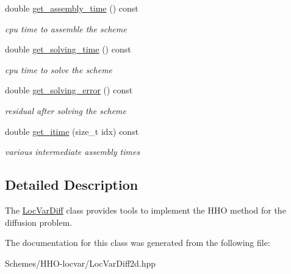 \begin{DoxyCompactItemize}
double \hyperlink{group__HHO__locvar_gae772fea2b994fc7b91bf5464cdc3ba1e}{get\+\_\+assembly\+\_\+time} () const
\begin{DoxyCompactList}\small\item\em cpu time to assemble the scheme \end{DoxyCompactList}\item 
double \hyperlink{group__HHO__locvar_ga2a88d6a8c9b52e620a346f5d01e15bbb}{get\+\_\+solving\+\_\+time} () const
\begin{DoxyCompactList}\small\item\em cpu time to solve the scheme \end{DoxyCompactList}\item 
double \hyperlink{group__HHO__locvar_gaa2d93fad6446a1648cd898fcf19be40a}{get\+\_\+solving\+\_\+error} () const
\begin{DoxyCompactList}\small\item\em residual after solving the scheme \end{DoxyCompactList}\item 
double \hyperlink{group__HHO__locvar_gab6163348bd0188208049a1ad1c10d105}{get\+\_\+itime} (size\+\_\+t idx) const
\begin{DoxyCompactList}\small\item\em various intermediate assembly times \end{DoxyCompactList}\end{DoxyCompactItemize}


\subsection{Detailed Description}
The \hyperlink{classHArDCore2D_1_1LocVarDiff}{Loc\+Var\+Diff} class provides tools to implement the H\+HO method for the diffusion problem. 

The documentation for this class was generated from the following file\+:\begin{DoxyCompactItemize}
\item 
Schemes/\+H\+H\+O-\/locvar/Loc\+Var\+Diff2d.\+hpp\end{DoxyCompactItemize}
